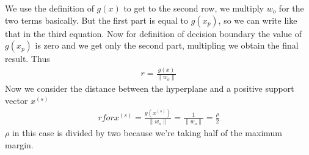 \documentclass[12pt]{book}
\begin{document}
We use the definition of $g(x)$ to get to the second row, we multiply $w_o$ for the two terms basically.\newline
But the first part is equal to $g(x_p)$, so we can write like that in the third equation. Now for definition of decision boundary the value of $g(x_p)$ is zero and we get only the second part, multipling we obtain the final result.\newline
Thus
\begin{equation}
\begin{aligned}
	r = \frac{g(x)}{\|w_o\|}
\end{aligned}
\end{equation}
Now we consider the distance between the hyperplane and a positive support vector $x^{(s)}$
\begin{equation}
\begin{aligned}
	r for x^{(s)} = \frac{g(x^{(s)})}{\|w_o\|} = \frac{1}{\|w_o\|} = \frac{\rho}{2}
\end{aligned}
\end{equation}
$\rho$ in this case is divided by two because we're taking half of the maximum margin.
\newline\newline
\end{document}
